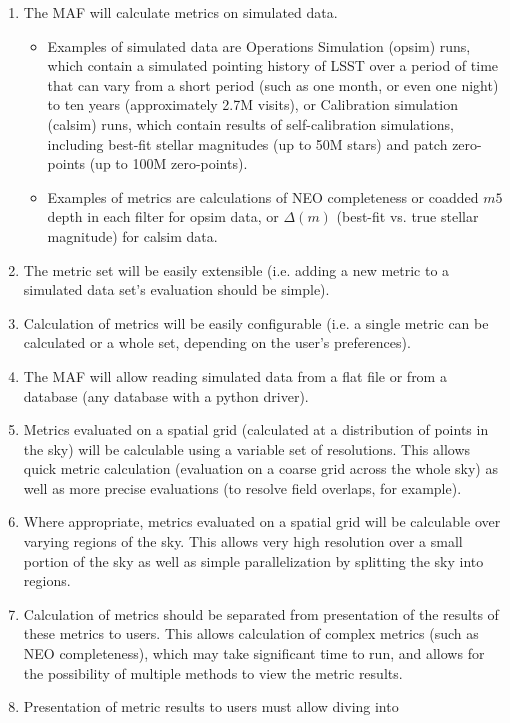 \documentclass[11pt, preprint]{aastex}
\begin{document}
\begin{enumerate}
\item{The MAF will calculate metrics on simulated data.}
\begin{itemize}
\item{Examples of simulated data are Operations Simulation (opsim)
  runs, which contain a simulated pointing history of LSST over a
  period of time that can vary from a short period (such as one month,
  or even one night) to ten years (approximately 2.7M visits), or
  Calibration simulation (calsim) runs, which contain results of
  self-calibration simulations, including best-fit stellar magnitudes
  (up to 50M stars) and patch zero-points (up to 100M zero-points).}
\item{Examples of metrics are calculations of NEO completeness or
  coadded $m5$ depth in each filter for opsim data, or $\Delta(m)$
  (best-fit vs. true stellar magnitude) for calsim data.}
\end{itemize}
\item{The metric set will be easily extensible (i.e. adding a new
  metric to a simulated data set's evaluation should be simple).}
\item{Calculation of metrics will be easily configurable (i.e. a
  single metric can be calculated or a whole set, depending on the
  user's preferences).}
\item{The MAF will allow reading simulated data from a flat file 
or from a database (any database with a python driver).}
\item{Metrics evaluated on a spatial grid (calculated at a distribution of points in the sky)
 will be calculable using a variable set
  of resolutions. This allows quick metric calculation (evaluation on
  a coarse grid across the whole sky) as well as more precise
  evaluations (to resolve field overlaps, for example).}
\item{Where appropriate, metrics evaluated on a  spatial grid will be calculable
  over varying regions of the sky. This allows very high resolution
  over a small portion of the sky as well as simple parallelization by
  splitting the sky into regions.}
\item{Calculation of metrics should be separated from presentation of
  the results of these metrics to users. This allows calculation of
  complex metrics (such as NEO completeness), which may take
  significant time to run, and allows for the possibility of multiple
  methods to view the metric results. }
\item{Presentation of metric results to users must allow diving into
}
\end{enumerate}
\end{document}
